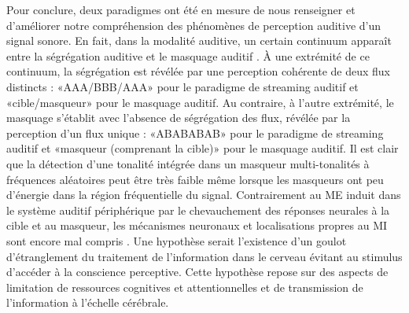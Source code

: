 Pour conclure, deux paradigmes ont été en mesure de nous renseigner et d'améliorer notre compréhension des phénomènes de perception auditive d'un signal sonore. 
En fait, dans la modalité auditive, un certain continuum apparaît entre la ségrégation auditive et le masquage auditif \citep{chang2016detection, lutfi2012detection, lutfi2013information}. 
À une extrémité de ce continuum, la ségrégation est révélée par une perception cohérente de deux flux distincts : «AAA/BBB/AAA» pour le paradigme de streaming auditif et «cible/masqueur» pour le masquage auditif. 
Au contraire, à l'autre extrémité, le masquage s'établit avec l'absence de ségrégation des flux, révélée par la perception d'un flux unique : «ABABABAB» pour le paradigme de streaming auditif et «masqueur (comprenant la cible)» pour le masquage auditif. 
Il est clair que la détection d'une tonalité intégrée dans un masqueur multi-tonalités à fréquences aléatoires peut être très faible même lorsque les masqueurs ont peu d'énergie dans la région fréquentielle du signal.
Contrairement au ME induit dans le système auditif périphérique par le chevauchement des réponses neurales à la cible et au masqueur, les mécanismes neuronaux et localisations propres au MI sont encore mal compris \citep{shinn2008object}. 
Une hypothèse serait l'existence d'un goulot d'étranglement du traitement de l'information dans le cerveau \citep{overath2007information, gutschalk2008neural} évitant au stimulus d'accéder à la conscience perceptive. 
Cette hypothèse repose sur des aspects de limitation de ressources cognitives et attentionnelles et de transmission de l'information à l'échelle cérébrale. 

